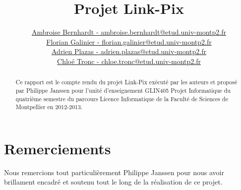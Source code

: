 \documentclass[22pt, a4paper]{report}
\title{\textbf{Projet Link-Pix}}
\author{
  \href{mailto:ambroise.bernhardt@etud.univ-montp2.fr}{Ambroise Bernhardt - ambroise.bernhardt@etud.univ-montp2.fr}\\
  \href{mailto:florian.galinier@etud.univ-montp2.fr}{Florian Galinier - florian.galinier@etud.univ-montp2.fr}\\
  \href{mailto:adrien.plazas@etud.univ-montp2.fr}{Adrien Plazas - adrien.plazas@etud.univ-montp2.fr}\\
  \href{mailto:chloe.tronc@etud.univ-montp2.fr}{Chloé Tronc - chloe.tronc@etud.univ-montp2.fr}
}
\date{}
\begin{document}
\maketitle

\begin{abstract}
Ce rapport est le compte rendu du projet Link-Pix exécuté par les auteurs et proposé par Philippe Janssen pour l'unité d'enseignement GLIN405 Projet Informatique du quatrième semestre du parcours Licence Informatique de la Faculté de Sciences de Montpellier en 2012-2013.
\end{abstract}

\chapter*{Remerciements}
Nous remercions tout particulièrement Philippe Janssen pour nous avoir brillament encadré et soutenu tout le long de la réalisation de ce projet.

\tableofcontents









\appendix




\end{document}
